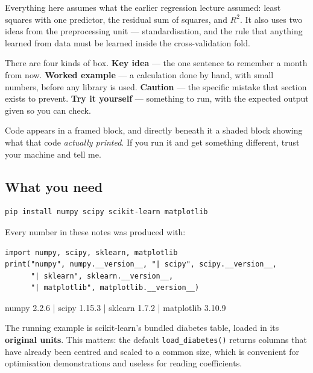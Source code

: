 \documentclass[11pt]{article}
\begin{document}
Everything here assumes what the earlier regression lecture assumed: least
squares with one predictor, the residual sum of squares, and $R^2$. It also
uses two ideas from the preprocessing unit --- standardisation, and the rule
that anything learned from data must be learned inside the cross-validation
fold.

There are four kinds of box. \textbf{Key idea} --- the one sentence to
remember a month from now. \textbf{Worked example} --- a calculation done by
hand, with small numbers, before any library is used. \textbf{Caution} --- the
specific mistake that section exists to prevent. \textbf{Try it yourself} ---
something to run, with the expected output given so you can check.

Code appears in a framed block, and directly beneath it a shaded block showing
what that code \emph{actually printed}. If you run it and get something
different, trust your machine and tell me.

\subsection{What you need}

\begin{lstlisting}
pip install numpy scipy scikit-learn matplotlib
\end{lstlisting}

Every number in these notes was produced with:

\begin{lstlisting}
import numpy, scipy, sklearn, matplotlib
print("numpy", numpy.__version__, "| scipy", scipy.__version__,
      "| sklearn", sklearn.__version__,
      "| matplotlib", matplotlib.__version__)
\end{lstlisting}
\begin{codeout}
numpy 2.2.6 | scipy 1.15.3 | sklearn 1.7.2 | matplotlib 3.10.9
\end{codeout}

The running example is scikit-learn's bundled diabetes table, loaded in its
\textbf{original units}. This matters: the default \texttt{load\_diabetes()}
returns columns that have already been centred and scaled to a common size,
which is convenient for optimisation demonstrations and useless for reading
coefficients.
\end{document}

